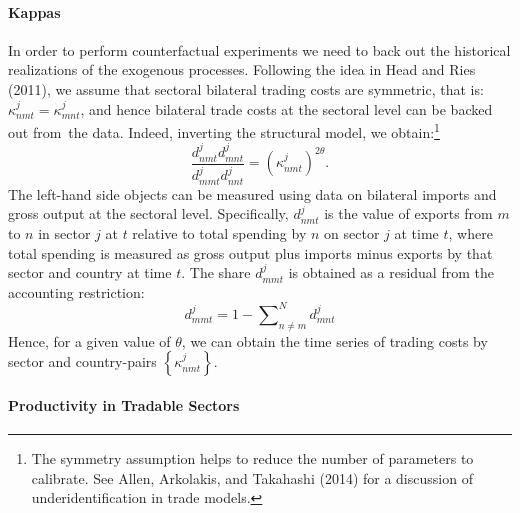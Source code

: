 \documentclass[12pt]{article}
\begin{document}
\paragraph{Kappas}

In order to perform counterfactual experiments we need to back out the
historical realizations of the exogenous processes. Following the idea in
Head and Ries (2011), we assume that sectoral bilateral trading costs are
symmetric, that is: $\kappa _{nmt}^{j}=\kappa _{mnt}^{j}$, and hence
bilateral trade costs at the sectoral level can be backed out from\ the
data. Indeed, inverting the structural model, we obtain:\footnote{%
The symmetry assumption helps to reduce the number of parameters to
calibrate. See Allen, Arkolakis, and Takahashi (2014) for a discussion of
underidentification in trade models.} 
\begin{equation}
\frac{d_{nmt}^{j}d_{mnt}^{j}}{d_{mmt}^{j}d_{nnt}^{j}}=\left( \kappa
_{nmt}^{j}\right) ^{2\theta }.  \label{kappa}
\end{equation}%
The left-hand side objects can be measured using data on bilateral imports
and gross output at the sectoral level. Specifically, $d_{nmt}^{j}$ is the
value of exports from $m$ to $n$ in sector $j$ at $t$ relative to total
spending by $n$ on sector $j$ at time $t$, where total spending is measured
as gross output plus imports minus exports by that sector and country at
time $t.$ The share $d_{mmt}^{j}$ is obtained as a residual from the
accounting restriction: 
\begin{equation*}
d_{mmt}^{j}=1-\sum\nolimits_{n\neq m}^{N}d_{mnt}^{j}
\end{equation*}%
Hence, for a given value of $\theta $, we can obtain the time series of
trading costs by sector and country-pairs $\left\{ \kappa _{nmt}^{j}\right\} 
$.

\paragraph{Productivity in Tradable Sectors}
\end{document}
